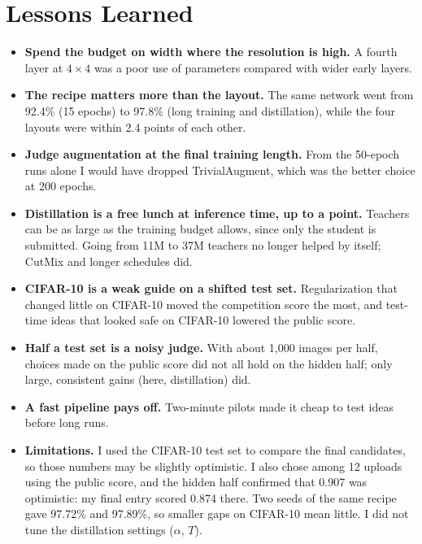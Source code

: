 \documentclass[letterpaper]{article}
\begin{document}
\section{Lessons Learned}
\begin{itemize}
\item \textbf{Spend the budget on width where the resolution is high.} A fourth layer at $4\times4$ was a poor use
of parameters compared with wider early layers.
\item \textbf{The recipe matters more than the layout.} The same network went from 92.4\% (15 epochs) to 97.8\%
(long training and distillation), while the four layouts were within 2.4 points of each other.
\item \textbf{Judge augmentation at the final training length.} From the 50-epoch runs alone I would have dropped
TrivialAugment, which was the better choice at 200 epochs.
\item \textbf{Distillation is a free lunch at inference time, up to a point.} Teachers can be as large as the training
budget allows, since only the student is submitted. Going from 11M to 37M teachers no longer helped by itself; CutMix
and longer schedules did.
\item \textbf{CIFAR-10 is a weak guide on a shifted test set.} Regularization that changed little on CIFAR-10 moved the
competition score the most, and test-time ideas that looked safe on CIFAR-10 lowered the public score.
\item \textbf{Half a test set is a noisy judge.} With about 1,000 images per half, choices made on the public score
did not all hold on the hidden half; only large, consistent gains (here, distillation) did.
\item \textbf{A fast pipeline pays off.} Two-minute pilots made it cheap to test ideas before long runs.
\item \textbf{Limitations.} I used the CIFAR-10 test set to compare the final candidates, so those numbers may be
slightly optimistic. I also chose among 12 uploads using the public score, and the hidden half confirmed that 0.907
was optimistic: my final entry scored 0.874 there. Two seeds of the same recipe gave 97.72\% and 97.89\%, so smaller
gaps on CIFAR-10 mean little. I did not tune the distillation settings ($\alpha$, $T$).
\end{itemize}


\end{document}
